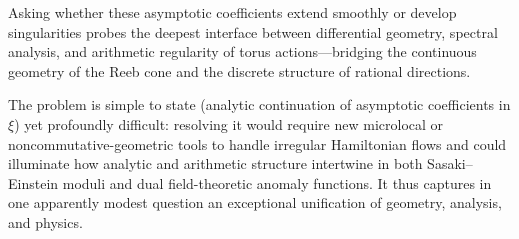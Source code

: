 Asking whether these asymptotic coefficients extend smoothly or develop singularities probes the deepest interface between differential geometry, spectral analysis, and arithmetic regularity of torus actions—bridging the continuous geometry of the Reeb cone and the discrete structure of rational directions.  

The problem is simple to state (analytic continuation of asymptotic coefficients in $\xi$) yet profoundly difficult: resolving it would require new microlocal or noncommutative-geometric tools to handle irregular Hamiltonian flows and could illuminate how analytic and arithmetic structure intertwine in both Sasaki–Einstein moduli and dual field-theoretic anomaly functions. It thus captures in one apparently modest question an exceptional unification of geometry, analysis, and physics.